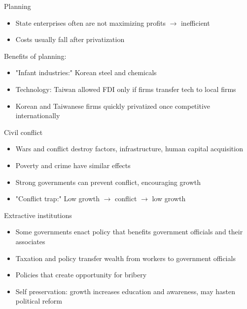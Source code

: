 \documentclass[10pt]{beamer}
\begin{document}
\begin{frame}[label={sec:org5bd1ee1}]{}
\alert{Planning}
\begin{itemize}
\item State enterprises often are not maximizing profits \(\rightarrow\) inefficient
\item Costs usually fall after privatization
\end{itemize}
Benefits of planning:
\begin{itemize}
\item "Infant industries:" Korean steel and chemicals
\item Technology: Taiwan allowed FDI only if firms transfer tech to local firms
\item Korean and Taiwanese firms quickly privatized once competitive internationally
\end{itemize}
\end{frame}

\begin{frame}[label={sec:org36f970f}]{}
\alert{Civil conflict}
\begin{itemize}
\item Wars and conflict destroy factors, infrastructure, human capital acquisition
\item Poverty and crime have similar effects
\item Strong governments can prevent conflict, encouraging growth
\item "Conflict trap:" Low growth \(\rightarrow\) conflict \(\rightarrow\) low growth
\end{itemize}
\end{frame}

\begin{frame}[label={sec:org6767351}]{}
\alert{Extractive institutions}
\begin{itemize}
\item Some governments enact policy that benefits government officials and their associates
\item Taxation and policy transfer wealth from workers to government officials
\item Policies that create opportunity for bribery
\item Self preservation: growth increases education and awareness, may hasten political reform
\end{itemize}
\end{frame}
\end{document}
